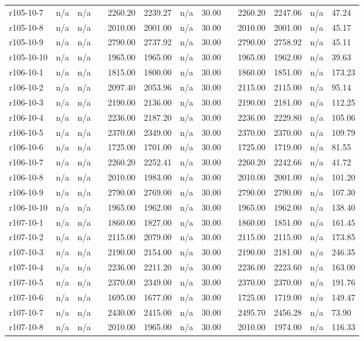 \documentclass[final,5p,times,twocolumn]{elsarticle}
\begin{document}
{{{{{{{{{{{{{\begin{longtable}{l l l l l l l l l l l l l}
r105-10-7& n/a& n/a&&2260.20& 2239.27& n/a& 30.00&&2260.20& 2247.06& n/a& 47.24\\
r105-10-8& n/a& n/a&&2010.00& 2001.00& n/a& 30.00&&2010.00& 2001.00& n/a& 45.17\\
r105-10-9& n/a& n/a&&2790.00& 2737.92& n/a& 30.00&&2790.00& 2758.92& n/a& 45.11\\
r105-10-10& n/a& n/a&&1965.00& 1965.00& n/a& 30.00&&1965.00& 1962.00& n/a& 39.63\\
r106-10-1& n/a& n/a&&1815.00& 1800.00& n/a& 30.00&&1860.00& 1851.00& n/a& 173.23\\
r106-10-2& n/a& n/a&&2097.40& 2053.96& n/a& 30.00&&2115.00& 2115.00& n/a& 95.14\\
r106-10-3& n/a& n/a&&2190.00& 2136.00& n/a& 30.00&&2190.00& 2181.00& n/a& 112.25\\
r106-10-4& n/a& n/a&&2236.00& 2187.20& n/a& 30.00&&2236.00& 2229.80& n/a& 105.06\\
r106-10-5& n/a& n/a&&2370.00& 2349.00& n/a& 30.00&&2370.00& 2370.00& n/a& 109.79\\
r106-10-6& n/a& n/a&&1725.00& 1701.00& n/a& 30.00&&1725.00& 1719.00& n/a& 81.55\\
r106-10-7& n/a& n/a&&2260.20& 2252.41& n/a& 30.00&&2260.20& 2242.66& n/a& 41.72\\
r106-10-8& n/a& n/a&&2010.00& 1983.00& n/a& 30.00&&2010.00& 2001.00& n/a& 101.20\\
r106-10-9& n/a& n/a&&2790.00& 2769.00& n/a& 30.00&&2790.00& 2790.00& n/a& 107.30\\
r106-10-10& n/a& n/a&&1965.00& 1962.00& n/a& 30.00&&1965.00& 1962.00& n/a& 138.40\\
r107-10-1& n/a& n/a&&1860.00& 1827.00& n/a& 30.00&&1860.00& 1851.00& n/a& 161.45\\
r107-10-2& n/a& n/a&&2115.00& 2079.00& n/a& 30.00&&2115.00& 2115.00& n/a& 173.85\\
r107-10-3& n/a& n/a&&2190.00& 2154.00& n/a& 30.00&&2190.00& 2181.00& n/a& 246.35\\
r107-10-4& n/a& n/a&&2236.00& 2211.20& n/a& 30.00&&2236.00& 2223.60& n/a& 163.00\\
r107-10-5& n/a& n/a&&2370.00& 2349.00& n/a& 30.00&&2370.00& 2370.00& n/a& 191.76\\
r107-10-6& n/a& n/a&&1695.00& 1677.00& n/a& 30.00&&1725.00& 1719.00& n/a& 149.47\\
r107-10-7& n/a& n/a&&2430.00& 2415.00& n/a& 30.00&&2495.70& 2456.28& n/a& 73.90\\
r107-10-8& n/a& n/a&&2010.00& 1965.00& n/a& 30.00&&2010.00& 1974.00& n/a& 116.33\\

\end{longtable}}}}}}}}}}}}}}
\end{document}
